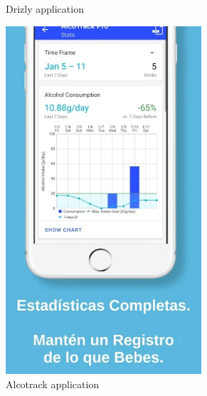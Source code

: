 \begin{figure}[H]
\begin{subfigure}{0.3\textwidth}
      \caption{Drizly \cite{Drizly} application}
      \label{Drizly}
  \end{subfigure}\hfill
  \begin{subfigure}{0.38\textwidth}
      \centering
      \includegraphics[width=0.8\textwidth]{./img/Alcotrack.png}
      \caption{Alcotrack \cite{alcotrack} application}
      \label{Alcotrack}
  \end{subfigure}
  \begin{subfigure}{0.3\textwidth}
      \centering

\end{subfigure}
\end{figure}
